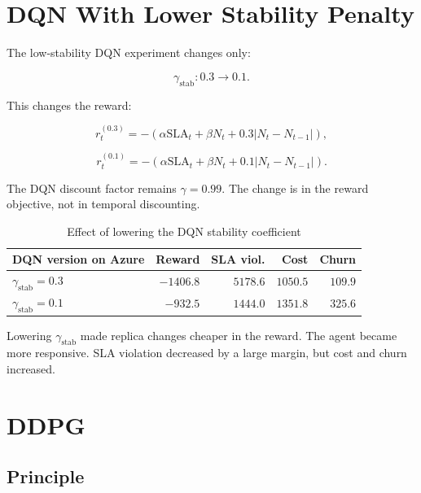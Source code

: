 \documentclass{rapportINPTCLOUD}
\begin{document}
\section{DQN With Lower Stability Penalty}

The low-stability DQN experiment changes only:

\begin{equation}
\gamma_{\text{stab}}: 0.3 \rightarrow 0.1.
\end{equation}

This changes the reward:

\begin{equation}
r_t^{(0.3)}
=
-
\left(
\alpha \text{SLA}_t
+ \beta N_t
+ 0.3 |N_t-N_{t-1}|
\right),
\end{equation}

\begin{equation}
r_t^{(0.1)}
=
-
\left(
\alpha \text{SLA}_t
+ \beta N_t
+ 0.1 |N_t-N_{t-1}|
\right).
\end{equation}

The DQN discount factor remains $\gamma=0.99$. The change is in the reward objective, not in temporal discounting.

\begin{table}[H]
\centering
\begin{tabular}{lrrrr}
\toprule
\textbf{DQN version on Azure} & \textbf{Reward} & \textbf{SLA viol.} & \textbf{Cost} & \textbf{Churn} \\
\midrule
$\gamma_{\text{stab}}=0.3$ & $-1406.8$ & $5178.6$ & $1050.5$ & $109.9$ \\
$\gamma_{\text{stab}}=0.1$ & $-932.5$ & $1444.0$ & $1351.8$ & $325.6$ \\
\bottomrule
\end{tabular}
\caption{Effect of lowering the DQN stability coefficient}
\label{tab:dqn-gamma-stab}
\end{table}

Lowering $\gamma_{\text{stab}}$ made replica changes cheaper in the reward. The agent became more responsive. SLA violation decreased by a large margin, but cost and churn increased.

\section{DDPG}

\subsection{Principle}
\end{document}
